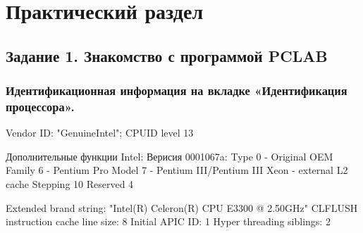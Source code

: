 \chapter{Практический раздел}

    \section{Задание 1. Знакомство с программой PCLAB}
        
        \subsection*{Идентификационная информация на вкладке «Идентификация процессора».}
        
\noindent
Vendor ID: "GenuineIntel"; CPUID level 13\newline

\noindent
Дополнительные функции Intel:\newline
Верисия 0001067a:\newline
Type 0 - Original OEM\newline
Family 6 - Pentium Pro\newline
Model 7 - Pentium III/Pentium III Xeon - external L2 cache\newline
Stepping 10\newline
Reserved 4\newline

\noindent
Extended brand string: "Intel(R) Celeron(R) CPU E3300 @ 2.50GHz"\newline
CLFLUSH instruction cache line size: 8\newline
Initial APIC ID: 1\newline
Hyper threading siblings: 2\newline

